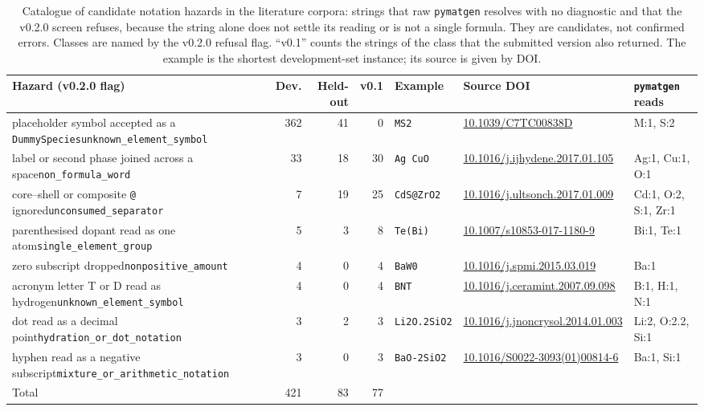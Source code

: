 \begin{table}[!t]
\centering
\caption{Catalogue of candidate notation hazards in the literature corpora: strings that raw \texttt{pymatgen} resolves with no diagnostic and that the v0.2.0 screen refuses, because the string alone does not settle its reading or is not a single formula. They are candidates, not confirmed errors. Classes are named by the v0.2.0 refusal flag. ``v0.1'' counts the strings of the class that the submitted version also returned. The example is the shortest development-set instance; its source is given by DOI.}
\label{tab:hazards}
\footnotesize
\setlength{\tabcolsep}{4pt}
\begin{tabular}{@{}p{4.8cm}rrrlp{3.0cm}p{2.4cm}@{}}
\toprule
Hazard (v0.2.0 flag) & Dev. & Held-out & v0.1 & Example & Source DOI & \texttt{pymatgen} reads \\
\midrule
placeholder symbol accepted as a \texttt{DummySpecies}\newline\texttt{\scriptsize unknown\_element\_symbol} & 362 & 41 & 0 & \texttt{MS2} & {\scriptsize\url{10.1039/C7TC00838D}} & M:1, S:2 \\
label or second phase joined across a space\newline\texttt{\scriptsize non\_formula\_word} & 33 & 18 & 30 & \texttt{Ag CuO} & {\scriptsize\url{10.1016/j.ijhydene.2017.01.105}} & Ag:1, Cu:1, O:1 \\
core--shell or composite \texttt{@} ignored\newline\texttt{\scriptsize unconsumed\_separator} & 7 & 19 & 25 & \texttt{CdS@ZrO2} & {\scriptsize\url{10.1016/j.ultsonch.2017.01.009}} & Cd:1, O:2, S:1, Zr:1 \\
parenthesised dopant read as one atom\newline\texttt{\scriptsize single\_element\_group} & 5 & 3 & 8 & \texttt{Te(Bi)} & {\scriptsize\url{10.1007/s10853-017-1180-9}} & Bi:1, Te:1 \\
zero subscript dropped\newline\texttt{\scriptsize nonpositive\_amount} & 4 & 0 & 4 & \texttt{BaW0} & {\scriptsize\url{10.1016/j.spmi.2015.03.019}} & Ba:1 \\
acronym letter T or D read as hydrogen\newline\texttt{\scriptsize unknown\_element\_symbol} & 4 & 0 & 4 & \texttt{BNT} & {\scriptsize\url{10.1016/j.ceramint.2007.09.098}} & B:1, H:1, N:1 \\
dot read as a decimal point\newline\texttt{\scriptsize hydration\_or\_dot\_notation} & 3 & 2 & 3 & \texttt{Li2O.2SiO2} & {\scriptsize\url{10.1016/j.jnoncrysol.2014.01.003}} & Li:2, O:2.2, Si:1 \\
hyphen read as a negative subscript\newline\texttt{\scriptsize mixture\_or\_arithmetic\_notation} & 3 & 0 & 3 & \texttt{BaO-2SiO2} & {\scriptsize\url{10.1016/S0022-3093(01)00814-6}} & Ba:1, Si:1 \\
\midrule
Total & 421 & 83 & 77 & & & \\
\bottomrule
\end{tabular}
\end{table}
